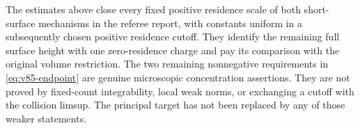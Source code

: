 The estimates above close every fixed positive residence scale of both
short-surface mechanisms in the referee report, with constants uniform
in a subsequently chosen positive residence cutoff. They identify the
remaining full surface height with one zero-residence charge and pay
its comparison with the original volume restriction. The two remaining
nonnegative requirements in \eqref{eq:v85-endpoint} are genuine
microscopic concentration assertions. They are not proved by fixed-count
integrability, local weak norms, or exchanging a cutoff with the
collision limsup. The principal target has not been replaced by any
of those weaker statements.
